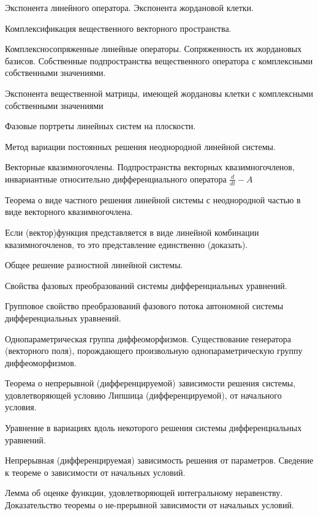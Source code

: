 \documentclass[a4paper]{article}
\begin{document}
\begin{nums}{-2}
\item
Экспонента линейного оператора. Экспонента жордановой клетки.
\item
Комплексификация вещественного векторного пространства.
\item
Комплексно\д сопряженные линейные операторы. Сопряженность их
жордановых базисов. Собственные подпространства вещественного
оператора с комплексными собственными значениями.
\item
Экспонента вещественной матрицы, имеющей жордановы клетки с
комплексными собственными значениями
\item
Фазовые портреты линейных систем на плоскости.
\item
Метод вариации постоянных решения неоднородной линейной системы.
\item
Векторные квазимногочлены. Подпространства векторных
квазимногочленов, инвариантные относительно дифференциального
оператора $\frac{d}{dt}-A$
\item
Теорема о виде частного решения линейной системы с неоднородной
частью в виде векторного квазимногочлена.
\item
Если (вектор)\д функция представляется в виде линейной комбинации
квазимногочленов, то это представление единственно (доказать).
\item
Общее решение разностной линейной системы.
\item
Свойства фазовых преобразований системы дифференциальных
уравнений.
\item
Групповое свойство преобразований фазового потока автономной
системы дифференциальных уравнений.
\item
Однопараметрическая группа диффеоморфизмов. Существование
генератора (векторного поля), порождающего произвольную
однопараметрическую группу диффеоморфизмов.
\item
Теорема о непрерывной (дифференцируемой) зависимости решения
системы, удовлетворяющей условию Липшица (дифференцируемой), от
начального условия.
\item
Уравнение в вариациях вдоль некоторого решения системы
дифференциальных уравнений.
\item
Непрерывная (дифференцируемая) зависимость решения от параметров.
Сведение к теореме о зависимости от начальных условий.
\item
Лемма об оценке функции, удовлетворяющей интегральному
неравенству. Доказательство теоремы о не-\break прерывной зависимости от
начальных условий.
\item

\end{nums}
\end{document}
